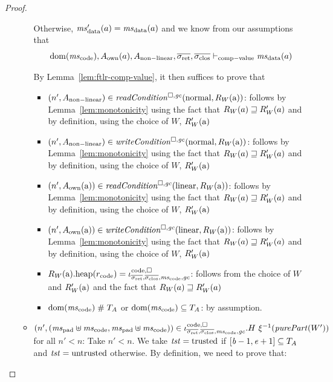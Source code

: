 \documentclass[a4paper]{article}
\begin{document}
\begin{proof}
\begin{itemize}
\begin{itemize}
      Otherwise, $\msdata'(a) = \msdata(a)$ and we know from our assumptions that
      \begin{equation*}
        \dom(\mscode),A_{\mathrm{own}}(a),A_{\mathrm{non-linear}},\sigrets,\sigcloss \vdash_{\mathrm{comp-value}} \msdata(a)
      \end{equation*}
      
      By Lemma~\ref{lem:ftlr-comp-value}, it then suffices to prove that
      \begin{itemize}
      \item $\npair[n']{A_{\mathrm{non-linear}}} \in \readCond{\normal,R_W(\addr)}$: follows by Lemma~\ref{lem:monotonicity} using the fact that $R_W(a) \sqsupseteq R_W'(a)$ and by definition, using the choice of $W$, $R_W'(\mathrm{a})$ 
      \item $\npair[n']{A_{\mathrm{non-linear}}} \in \writeCond{\normal,R_W(\addr)}$: follows by Lemma~\ref{lem:monotonicity} using the fact that $R_W(a) \sqsupseteq R_W'(a)$ and by definition, using the choice of $W$, $R_W'(\mathrm{a})$ 
      \item $\npair[n']{A_{\mathrm{own}}(\addr)} \in \readCond{\linear,R_W(\addr)}$: follows by Lemma~\ref{lem:monotonicity} using the fact that $R_W(a) \sqsupseteq R_W'(a)$ and by definition, using the choice of $W$, $R_W'(\mathrm{a})$ 
      \item $\npair[n']{A_{\mathrm{own}}(\addr)} \in \writeCond{\linear,R_W(\addr)}$: follows by Lemma~\ref{lem:monotonicity} using the fact that $R_W(a) \sqsupseteq R_W'(a)$ and by definition, using the choice of $W$, $R_W'(\mathrm{a})$ 
      \item $\pwheap[R_W(\addr)](r_{\mathrm{code}}) = \codereg{\sigrets,\sigcloss,\mscode,\gc}$: follows from the choice of $W$ and $R_W'(\mathrm{a})$ and the fact that $R_W(a) \sqsupseteq R_W'(a)$
      \item $\dom(\mscode) \mathrel{\#} \ta$ or $\dom(\mscode) \subseteq \ta$: by assumption.
      \end{itemize}
    \item $\npair[n']{(\mspad\uplus\mscode,\mspad\uplus\mscode)} \in  \codereg[\mathrm{code},\square]{\sigrets,\sigcloss,\mscode,\gc}.H~ \xi^{-1}(\purePart{W'})$ for all $n' < n$:
      Take $n' < n$.
      We take $\mathit{tst} = \mathrm{trusted}$ if $[\mathit{b}-1,\mathit{e}+1] \subseteq T_{A}$ and $\mathit{tst} =\mathrm{untrusted}$ otherwise.
      By definition, we need to prove that:
      

\end{itemize}
\end{itemize}
\end{proof}
\end{document}
